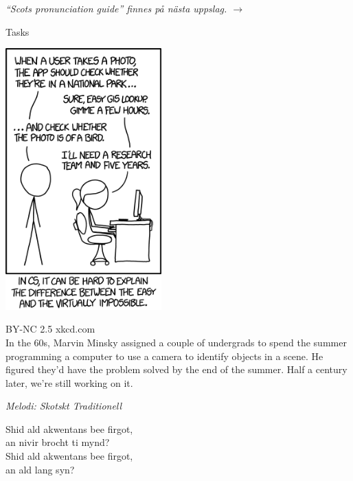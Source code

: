 \vspace{15pt}
{\footnotesize\textit{``Scots pronunciation guide'' finnes på nästa uppslag. $\rightarrow$}}\par
\vfill
{}
\begin{center}
  \tiny{Tasks}\par
  \vspace{5pt}
  \includegraphics[keepaspectratio,width=0.45\textwidth]{elements/images/tasks.png}\par
  \vspace{5pt}
  \tiny{BY-NC 2.5 xkcd.com\\ In the 60s, Marvin Minsky assigned a couple of undergrads to spend the summer programming a computer to use a camera to identify objects in a scene. He figured they'd have the problem solved by the end of the summer. Half a century later, we're still working on it.}
\end{center}
\par
\vfill
\newpage
{}
{\footnotesize\textit{Melodi: Skotskt Traditionell}}\par
\vspace{10pt}
Shid ald akwentans bee firgot,\\
an nivir brocht ti mynd?\\
Shid ald akwentans bee firgot,\\
an ald lang syn?\par
\vspace{9pt}
